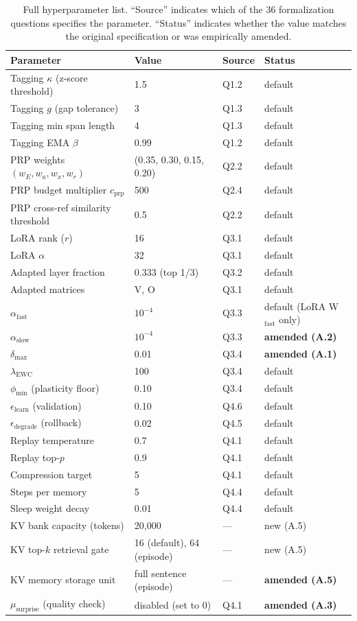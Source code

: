 \begin{table}[ht]
\centering
\caption{Full hyperparameter list. ``Source'' indicates which of the 36 formalization questions specifies the parameter. ``Status'' indicates whether the value matches the original specification or was empirically amended.}
\label{tab:hyperparams_full}
\begin{tabular}{llll}
\toprule
Parameter & Value & Source & Status \\
\midrule
Tagging $\kappa$ (z-score threshold) & 1.5 & Q1.2 & default \\
Tagging $g$ (gap tolerance) & 3 & Q1.3 & default \\
Tagging min span length & 4 & Q1.3 & default \\
Tagging EMA $\beta$ & 0.99 & Q1.2 & default \\
PRP weights $(w_E, w_a, w_x, w_r)$ & (0.35, 0.30, 0.15, 0.20) & Q2.2 & default \\
PRP budget multiplier $c_\mathrm{prp}$ & 500 & Q2.4 & default \\
PRP cross-ref similarity threshold & 0.5 & Q2.2 & default \\
LoRA rank ($r$) & 16 & Q3.1 & default \\
LoRA $\alpha$ & 32 & Q3.1 & default \\
Adapted layer fraction & 0.333 (top 1/3) & Q3.2 & default \\
Adapted matrices & V, O & Q3.1 & default \\
$\alpha_\mathrm{fast}$ & $10^{-4}$ & Q3.3 & default (LoRA W$_\mathrm{fast}$ only) \\
$\alpha_\mathrm{slow}$ & $10^{-4}$ & Q3.3 & \textbf{amended (A.2)} \\
$\delta_\mathrm{max}$ & 0.01 & Q3.4 & \textbf{amended (A.1)} \\
$\lambda_\mathrm{EWC}$ & 100 & Q3.4 & default \\
$\phi_\mathrm{min}$ (plasticity floor) & 0.10 & Q3.4 & default \\
$\epsilon_\mathrm{learn}$ (validation) & 0.10 & Q4.6 & default \\
$\epsilon_\mathrm{degrade}$ (rollback) & 0.02 & Q4.5 & default \\
Replay temperature & 0.7 & Q4.1 & default \\
Replay top-$p$ & 0.9 & Q4.1 & default \\
Compression target & 5 & Q4.1 & default \\
Steps per memory & 5 & Q4.4 & default \\
Sleep weight decay & 0.01 & Q4.4 & default \\
KV bank capacity (tokens) & 20{,}000 & --- & new (A.5) \\
KV top-$k$ retrieval gate & 16 (default), 64 (episode) & --- & new (A.5) \\
KV memory storage unit & full sentence (episode) & --- & \textbf{amended (A.5)} \\
$\mu_\mathrm{surprise}$ (quality check) & disabled (set to 0) & Q4.1 & \textbf{amended (A.3)} \\
\bottomrule
\end{tabular}
\end{table}


